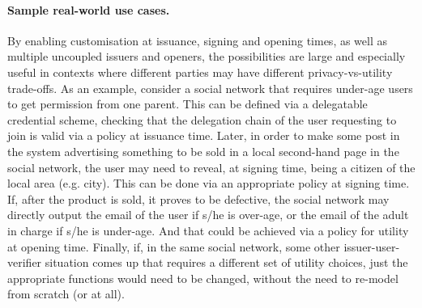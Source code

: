 \paragraph{Sample real-world use cases.} %
By enabling customisation at issuance, signing and opening times, as well as
multiple uncoupled issuers and openers, the possibilities are large and
especially useful in contexts where different parties may have different
privacy-vs-utility trade-offs. As an example, consider a social network that
requires under-age users to get permission from one parent. This can be defined
via a delegatable credential scheme, checking that the delegation chain of the
user requesting to join is valid via a policy at issuance time. Later, in order
to make some post in the system advertising something to be sold in a local
second-hand page in the social network, the user may need to reveal, at signing
time, being a citizen of the local area (e.g. city). This can be done via an
appropriate policy at signing time. If, after the product is sold, it proves
to be defective, the social network may directly output the email of the user
if s/he is over-age, or the email of the adult in charge if s/he is under-age.
And that could be achieved via a policy for utility at opening time. Finally,
if, in the same social network, some other
issuer-user-verifier situation comes up that requires a different set of utility
choices, just the appropriate functions would need to be changed, without the
need to re-model from scratch (or at all).


